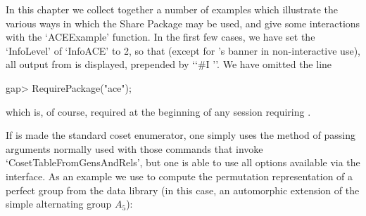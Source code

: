 
In this chapter  we  collect  together  a  number  of  examples  which
illustrate the various ways in which the {\ACE} Share Package  may  be
used, and give some interactions with the  `ACEExample'  function.  In
the first few cases, we have set the `InfoLevel' of `InfoACE' to 2, so
that (except for {\ACE}'s banner in non-interactive use),  all  output
from {\ACE} is displayed, prepended by \lq{}`\#I ''. We  have  omitted
the line

\begintt
gap> RequirePackage("ace");
\endtt

which is,  of  course,  required  at  the  beginning  of  any  session
requiring {\ACE}.


If {\ACE} is made the standard coset enumerator, one simply  uses  the
method of passing arguments normally used  with  those  commands  that
invoke `CosetTableFromGensAndRels', but one is able to use all options
available via the {\ACE} interface. As an example  we  use  {\ACE}  to
compute the permutation representation of a  perfect  group  from  the
data library (in this case, an automorphic  extension  of  the  simple
alternating group $A_5$):

